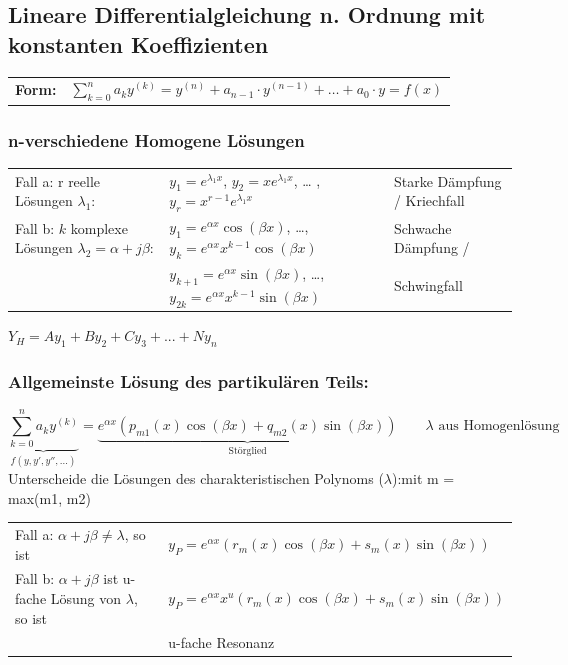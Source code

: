 \subsection{Lineare Differentialgleichung n. Ordnung mit konstanten 
Koeffizienten }
\begin{tabular}{p{8cm}p{8cm}}
\textbf{Form:} &
$\sum\limits_{k=0}^na_ky^{(k)}= y^{(n)}+a_{n-1}\cdot y^{(n-1)}+\ldots +a_0\cdot y=f(x)$\\
\end{tabular}

\subsubsection{n-verschiedene Homogene Lösungen}
\begin{tabular}{lll}
Fall a: r reelle Lösungen $\lambda_1$: 
	& $y_1=e^{\lambda_1x}$, $y_2=xe^{\lambda_1x}$, \ldots
	,$y_r=x^{r-1}e^{\lambda_1x}$ 
	& Starke Dämpfung / Kriechfall\\
Fall b: $k$ komplexe Lösungen $\lambda_2=\alpha +j\beta$: 
	&$y_1=e^{\alpha x}\cos(\beta x)$, \ldots, $y_k=e^{\alpha x}x^{k-1}\cos(\beta
x)$
	& Schwache Dämpfung /\\
	&$y_{k+1}=e^{\alpha x}\sin(\beta x)$, \ldots, $y_{2k}=e^{\alpha
x}x^{k-1}\sin(\beta x)$
	& Schwingfall\\
\end{tabular}
$Y_H = Ay_1 + By_2 + Cy_3 + ... + Ny_n$

\subsubsection{Allgemeinste Lösung des partikulären Teils:}
$$\underbrace{\sum_{k=0}^n a_k y^{(k)}}_{f(y,y',y'',\ldots)} = \underbrace{e^{\alpha x} (p_{m1}(x) \cos (\beta x) + q_{m2}(x) \sin (\beta x))}_{\text{Störglied}} \qquad \lambda \text{ aus Homogenlösung}$$
Unterscheide die Lösungen des charakteristischen Polynoms ($\lambda$):\hspace{5.5cm}mit m = max(m1, m2)\\
\begin{tabular}{p{8cm}p{8.5cm}}
Fall a: $\alpha + j\beta \neq \lambda$, so ist &
$y_P = e^{\alpha x}(r_m(x)\cos(\beta x) + s_m(x) \sin(\beta x))$\\
Fall b: $\alpha + j\beta$  ist u-fache Lösung von $\lambda$, so ist &
$y_P = e^{\alpha x} x^u (r_m(x) \cos(\beta x) + s_m(x) \sin(\beta x))$\\
&
u-fache Resonanz

\end{tabular}

